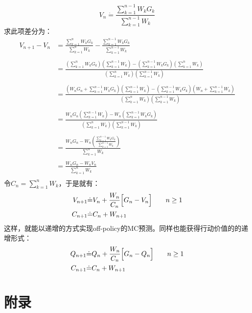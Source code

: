 \documentclass{ctexart}
\begin{document}
\begin{equation}
V_n \dot= \frac{\sum_{k=1}^{n-1}W_kG_k}{\sum_{k=1}^{n-1}W_k}
\end{equation}
求此项差分为：
\begin{align*}
V_{n+1} - V_n &= \frac{\sum_{k=1}^{n}W_kG_k}{\sum_{k=1}^{n}W_k} - \frac{\sum_{k=1}^{n-1}W_kG_k}{\sum_{k=1}^{n-1}W_k}\\
\\
&= \frac{\left(\sum_{k=1}^{n}W_kG_k\right)\left(\sum_{k=1}^{n-1}W_k\right)-\left(\sum_{k=1}^{n-1}W_kG_k\right)\left(\sum_{k=1}^{n}W_k\right)}{\left(\sum_{k=1}^{n}W_k\right)\left(\sum_{k=1}^{n-1}W_k\right)}\\
\\
&= \frac{\left(W_nG_n+\sum_{k=1}^{n-1}W_kG_k\right)\left(\sum_{k=1}^{n-1}W_k\right)-\left(\sum_{k=1}^{n-1}W_kG_k\right)\left(W_n+\sum_{k=1}^{n-1}W_k\right)}{\left(\sum_{k=1}^{n}W_k\right)\left(\sum_{k=1}^{n-1}W_k\right)}\\
\\
&= \frac{W_nG_n\left(\sum_{k=1}^{n-1}W_k\right)-W_n\left(\sum_{k=1}^{n-1}W_kG_k\right)}{\left(\sum_{k=1}^{n}W_k\right)\left(\sum_{k=1}^{n-1}W_k\right)}\\
\\
&= \frac{W_nG_n-W_n\left(\frac{\sum_{k=1}^{n-1}W_kG_k}{\sum_{k=1}^{n-1}W_k}\right)}{\sum_{k=1}^{n}W_k}\\
\\
&= \frac{W_nG_n-W_nV_n}{\sum_{k=1}^{n}W_k}\\
\end{align*}
令$C_n=\sum_{k=1}^nW_k$，于是就有：
\begin{align*}
V_{n+1} &\dot= V_n + \frac{W_n}{C_n}\Bigl[G_n-V_n\Bigr] \qquad n\ge1\\
C_{n+1} &\dot= C_n + W_{n+1}
\end{align*}
这样，就能以递增的方式实现off-policy的MC预测。同样也能获得行动价值的的递增形式：
\begin{align*}
Q_{n+1} &\dot= Q_n + \frac{W_n}{C_n}\Bigl[G_n-Q_n\Bigr]\qquad n\ge 1\\
C_{n+1} &\dot= C_n + W_{n+1}
\end{align*}


\section{附录}
\end{document}
